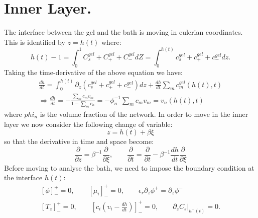 \documentclass[12pt]{extarticle}
\begin{document}
\section{Inner Layer.}
The interface between the gel and the bath is moving in eulerian coordinates. This is identified by $z=h(t)$ where:
\begin{equation}
h(t)-1=\int_0^1{C^{gel}_s+C^{gel}_++C^{gel}_-}dZ = \int_0^{h(t)} c^{gel}_s+c^{gel}_++c^{gel}_- dz.
\end{equation}
Taking the time-derivative of the above equation we have:
\begin{equation}
\begin{aligned}
\frac{d h}{dt}=\int_0^{h(t)}\partial_z\left(c^{gel}_s+c^{gel}_++c^{gel}_-\right)dz + \frac{d h}{dt}\sum_m c^{gel}_m(h(t),t)\\
\Rightarrow \frac{d h}{dt}=-\frac{\sum_m c_m v_m}{1-\sum_m c_\alpha}=-\phi_n^{-1}\sum_m c_m v_m=v_n(h(t),t)
\end{aligned}
\end{equation}
where $phi_n$ is the volume fraction of the network. In order to move in the inner layer we now consider the following change of variable:
\begin{equation}
z= h(t)+ \beta \xi
\end{equation}
so that the derivative in time and space become:
\begin{equation}
\frac{\partial}{\partial z} = \beta^{-1}\frac{\partial}{\partial \xi}, \qquad \frac{\partial}{\partial t}= \frac{\partial}{\partial t} - \beta^{-1} \frac{d h}{dt} \frac{\partial}{\partial \xi}
\end{equation}
Before moving to analyse the bath, we need to impose the boundary condition at the interface $h(t)$:
\begin{equation}
\begin{aligned}
\left[\phi\right]^+_-=0, \qquad \left[\mu_i\right]^+_-=0, \qquad \epsilon_r \partial_z \phi^+=\partial_z \phi^-\\
\left[T_z\right]^+_-=0, \qquad \left[c_i\left(v_i-\frac{dh}{dt}\right)\right]^+_-=0, \qquad\left.\partial_z C_s \right|_{h^-(t)}=0.
\end{aligned}
\end{equation}
\end{document}
